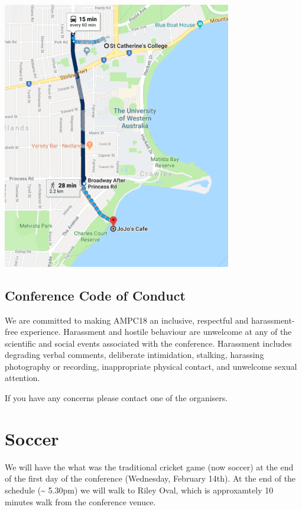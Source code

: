 \documentclass[]{article}
\begin{document}
\begin{center}
\vspace{1 cm}
\includegraphics[width=10cm]{images/Dinner}
\vspace{2 cm}
\end{center}

\subsection{Conference Code of
Conduct}\label{conference-code-of-conduct}

We are committed to making AMPC18 an inclusive, respectful and
harassment-free experience. Harassment and hostile behaviour are
unwelcome at any of the scientific and social events associated with the
conference. Harassment includes degrading verbal comments, deliberate
intimidation, stalking, harassing photography or recording,
inappropriate physical contact, and unwelcome sexual attention.

If you have any concerns please contact one of the organisers.

\section{Soccer}\label{soccer}

We will have the what was the traditional cricket game (now soccer) at
the end of the first day of the conference (Wednesday, February 14th).
At the end of the schedule (\textasciitilde{} 5.30pm) we will walk to
Riley Oval, which is approxamtely 10 minutes walk from the conference
venuce.
\end{document}
